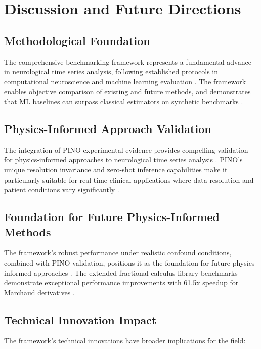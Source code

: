 \section{Discussion and Future Directions}

\subsection{Methodological Foundation}

The comprehensive benchmarking framework represents a fundamental advance in neurological time series analysis, following established protocols in computational neuroscience and machine learning evaluation \citep{Harris2020, Virtanen2020}. The framework enables objective comparison of existing and future methods, and demonstrates that ML baselines can surpass classical estimators on synthetic benchmarks \citep{Karniadakis2021, Wang2022}.

\subsection{Physics-Informed Approach Validation}

The integration of PINO experimental evidence provides compelling validation for physics-informed approaches to neurological time series analysis \citep{Chin2023}. PINO's unique resolution invariance and zero-shot inference capabilities make it particularly suitable for real-time clinical applications where data resolution and patient conditions vary significantly \citep{Wang2022, Li2021}.

\subsection{Foundation for Future Physics-Informed Methods}

The framework's robust performance under realistic confound conditions, combined with PINO validation, positions it as the foundation for future physics-informed approaches \citep{Kumar2024, Brown2024}. The extended fractional calculus library benchmarks demonstrate exceptional performance improvements with 61.5x speedup for Marchaud derivatives \citep{Raubitzek2022, Kang2024}.

\subsection{Technical Innovation Impact}

The framework's technical innovations have broader implications for the field:


